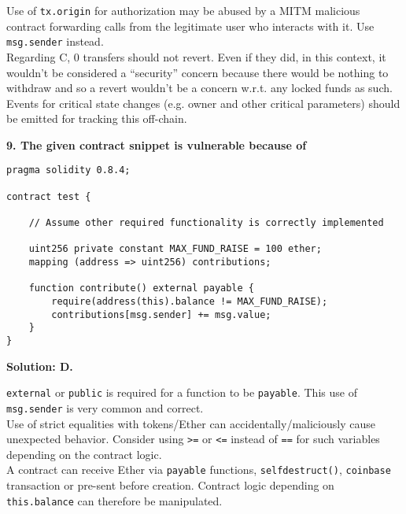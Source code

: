 Use of \verb|tx.origin| for authorization may be abused by a MITM malicious contract forwarding calls from the legitimate user who interacts with it.
Use \verb|msg.sender| instead.\\

Regarding C, 0 transfers should not revert.
Even if they did, in this context, it wouldn't be considered a ``security'' concern because there would be nothing to withdraw and so a revert wouldn't be a concern w.r.t. any locked funds as such.\\

Events for critical state changes (e.g. owner and other critical parameters) should be emitted for tracking this off-chain.\\

\pagebreak

\textbf{9. The given contract snippet is vulnerable because of}\label{sec:exam4_q9}\\

\begin{lstlisting}[language=Solidity, style=solStyle]
pragma solidity 0.8.4;

contract test {

    // Assume other required functionality is correctly implemented

    uint256 private constant MAX_FUND_RAISE = 100 ether;
    mapping (address => uint256) contributions;

    function contribute() external payable {
        require(address(this).balance != MAX_FUND_RAISE);
        contributions[msg.sender] += msg.value;
    }
}
\end{lstlisting}

\textbf{Solution: D.}

\verb|external| or \verb|public| is required for a function to be \verb|payable|.
This use of \verb|msg.sender| is very common and correct.\\

Use of strict equalities with tokens/Ether can accidentally/maliciously cause unexpected behavior.
Consider using \verb|>=| or \verb|<=| instead of \verb|==| for such variables depending on the contract logic.\\

A contract can receive Ether via \verb|payable| functions, \verb|selfdestruct()|, \verb|coinbase| transaction or pre-sent before creation.
Contract logic depending on \verb|this.balance| can therefore be manipulated.\\

